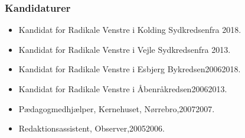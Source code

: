 \documentclass[11pt, a4paper]{awesome-cv}
\begin{document}
\begin{cvletter}
\subsubsection*{Kandidaturer}
\begin{itemize}
\item Kandidat for Radikale Venstre i Kolding Sydkredsenfra 2018.
\item Kandidat for Radikale Venstre i Vejle Sydkredsenfra 2013.
\item Kandidat for Radikale Venstre i Esbjerg Bykredsen20062018.
\item Kandidat for Radikale Venstre i Åbenråkredsen20062013.
\end{itemize}
\begin{itemize}
\item Pædagogmedhjælper, Kernehuset, Nørrebro,20072007.
\item Redaktionsassistent, Observer,20052006.
\end{itemize}
\end{cvletter}
\end{document}
